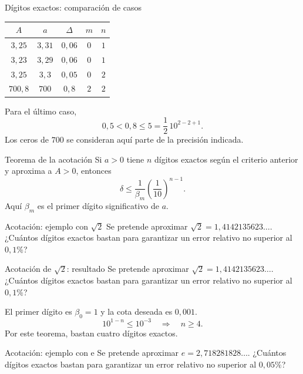 \documentclass[main.tex]{subfiles}
\begin{document}
\begin{frame}{Dígitos exactos: comparación de casos}
\begin{center}\begin{tabular}{c|c|c|c|c}$A$&$a$&$\Delta$&$m$&$n$\\\hline $3{,}25$&$3{,}31$&$0{,}06$&$0$&$1$\\$3{,}23$&$3{,}29$&$0{,}06$&$0$&$1$\\$3{,}25$&$3{,}3$&$0{,}05$&$0$&$2$\\$700{,}8$&$700$&$0{,}8$&$2$&$2$\end{tabular}\end{center}Para el último caso,\[0{,}5<0{,}8\le5=\frac12\,10^{2-2+1}.\]Los ceros de $700$ se consideran aquí parte de la precisión indicada.
\end{frame}

\begin{frame}{Teorema de la acotación}
Si $a>0$ tiene $n$ dígitos exactos según el criterio anterior y aproxima a $A>0$, entonces\[\boxed{\delta\le\frac1{\beta_m}\left(\frac1{10}\right)^{n-1}.}\]Aquí $\beta_m$ es el primer dígito significativo de $a$.
\end{frame}

\begin{frame}{Acotación: ejemplo con \texorpdfstring{$\sqrt2$}{raíz de 2}}
Se pretende aproximar $\sqrt2=1{,}4142135623\ldots$. ¿Cuántos dígitos exactos bastan para garantizar un error relativo no superior al $0{,}1\%$?
\end{frame}

\begin{frame}{Acotación de \texorpdfstring{$\sqrt2$}{raíz de 2}: resultado}
Se pretende aproximar $\sqrt2=1{,}4142135623\ldots$. ¿Cuántos dígitos exactos bastan para garantizar un error relativo no superior al $0{,}1\%$?\par\medskip El primer dígito es $\beta_0=1$ y la cota deseada es $0{,}001$.\[10^{1-n}\le10^{-3}\quad\Longrightarrow\quad n\ge4.\]Por este teorema, bastan cuatro dígitos exactos.
\end{frame}

\begin{frame}{Acotación: ejemplo con e}
Se pretende aproximar $e=2{,}718281828\ldots$. ¿Cuántos dígitos exactos bastan para garantizar un error relativo no superior al $0{,}05\%$?
\end{frame}
\end{document}
